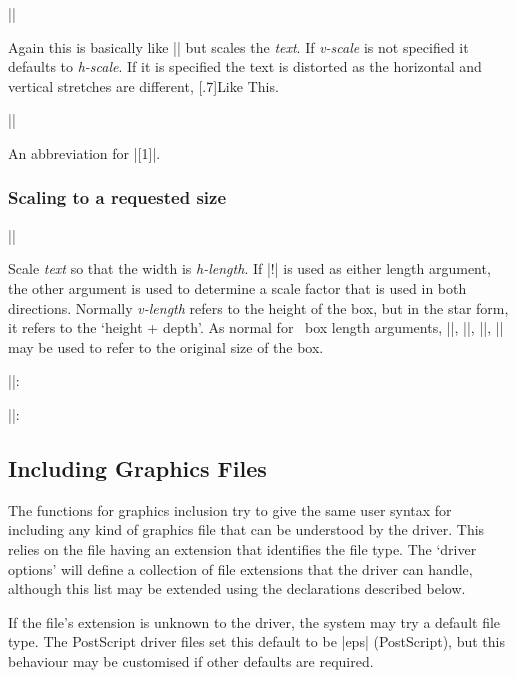\begin{decl}
|\scalebox|
\end{decl}

Again this is basically like |\mbox| but scales the \emph{text}.
If \emph{v-scale} is not specified it defaults to \emph{h-scale}.
If it is specified the text is distorted as the horizontal and
vertical stretches are different, \scalebox{3}[.7]{Like This}.


\begin{decl}
||
\end{decl}

An abbreviation for |\scalebox{-1}[1]|.

\subsubsection{Scaling to a requested size}

\begin{decl}
|\resizebox|\star{}
\end{decl}

 Scale \emph{text} so that the width is \emph{h-length}.
 If |!| is used as either length argument, the other argument is used
 to determine a scale factor that is used in both directions.
 Normally \emph{v-length} refers to the height of the box, but in the
 star form, it refers to the `height +  depth'. 
 As normal for \LaTeXe\ box length arguments, |\height|,
 |\width|, |\totalheight|, |\depth| may be used to refer to the
 original size of the box.

||: 

||: 

\subsection{Including Graphics Files}
The functions for graphics inclusion try to give the same user syntax
for including any kind of graphics file that can be understood by the
driver. This relies on the file having an extension that identifies
the file type. The `driver options' will define a collection of file
extensions that the driver can handle, although this list may be
extended using the declarations described below.

If the file's extension is unknown to the driver, the system may try a
default file type. The PostScript driver files set this default to be
|eps| (PostScript), but this behaviour may be customised if other
defaults are required.

